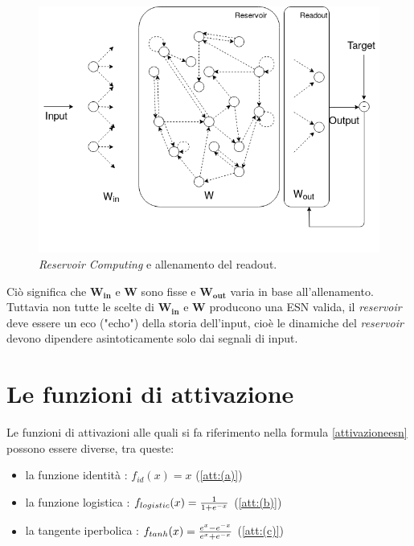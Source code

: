 \begin{figure}[h!]
	\centering 
	\includegraphics[width=0.7\linewidth]{immagini/RC.png}
	\caption{\textit{Reservoir Computing} e allenamento del readout.}
	\label{fig:RC}
\end{figure}

Ciò significa che $\mathbf{\mathbf{W_{in}}}$ e $\mathbf{\mathbf{W}}$ sono fisse e $\mathbf{\mathbf{W_{out}}}$ varia in base all'allenamento. Tuttavia non tutte le scelte di $\mathbf{\mathbf{W_{in}}}$ e $\mathbf{\mathbf{W}}$ producono una ESN valida, il \textit{reservoir} deve essere un eco ("echo") della storia dell'input, cioè le dinamiche del \textit{reservoir} devono dipendere asintoticamente solo dai segnali di input.


\section{Le funzioni di attivazione}
Le funzioni di attivazioni alle quali si fa riferimento nella formula \ref{attivazioneesn} possono essere diverse, tra queste:
\begin{itemize}
	\item la funzione identità : $f_{id}(x)=x$ (\ref{att:(a)})
	\item la funzione logistica : $f_{logistic}(x)=  {1 \over 1+ e^{-x} }$ (\ref{att:(b)})
	\item la tangente iperbolica : $f_{tanh}(x)=  {e^{x}- e^{-x} \over e^{x}+ e^{-x} }$ (\ref{att:(c)})
\end{itemize}


